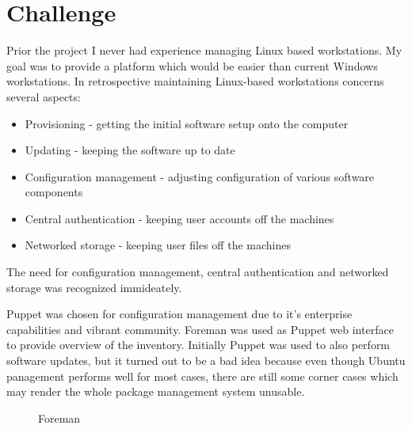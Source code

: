 \documentclass{article}
\begin{document}
\section{Challenge}

Prior the project I never had experience managing Linux based workstations.
My goal was to provide a platform which would be easier than current Windows
workstations.
In retrospective maintaining Linux-based workstations concerns several aspects:

\begin{itemize}
\item Provisioning - getting the initial software setup onto the computer
\item Updating - keeping the software up to date
\item Configuration management - adjusting configuration of various software components
\item Central authentication - keeping user accounts off the machines
\item Networked storage - keeping user files off the machines
\end{itemize}

The need for configuration management, central authentication and networked storage was
recognized immideately.

Puppet was chosen for configuration management due to it's enterprise capabilities
and vibrant community. Foreman was used as Puppet web interface to provide
overview of the inventory.
Initially Puppet was used to also perform software updates, but
it turned out to be a bad idea because even though Ubuntu panagement
performs well for most cases, there are still some corner cases
which may render the whole package management system unusable.

\begin{figure}[!htb]
\centering
{}
\caption{Foreman}
\label{fig:digraph}
\end{figure}
\end{document}
